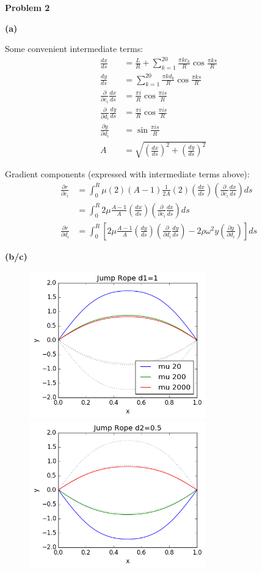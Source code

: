 \documentclass[11pt]{article}
\newcommand{\problem}{\medskip \noindent \textbf}
\begin{document}
\pagebreak

\problem{Problem 2}

\problem{(a)}

Some convenient intermediate terms:
\begin{align*}
\frac{dx}{ds} &= \frac{L}{R} + \sum_{k=1}^{20} \frac{\pi k c_k}{R} \cos \frac{\pi k s}{R}\\
\frac{dy}{ds} &= \sum_{k=1}^{20} \frac{\pi k d_k}{R} \cos \frac{\pi k s}{R}\\
\frac{\partial}{\partial c_i}\frac{dx}{ds} &= \frac{\pi i}{R} \cos \frac{\pi i s}{R}\\
\frac{\partial}{\partial d_i}\frac{dy}{ds} &= \frac{\pi i}{R} \cos \frac{\pi i s}{R}\\
\frac{\partial y}{\partial d_i} &= \sin \frac{\pi i s}{R}\\
A &= \sqrt{\left(\tfrac{dx}{ds}\right)^2 + \left(\tfrac{dy}{ds}\right)^2}
\end{align*}

Gradient components (expressed with intermediate terms above):
\begin{align*}
\frac{\partial r}{\partial c_i} &= \int_0^R \mu (2) \left(A-1\right) \frac{1}{2A} (2) \left(\frac{dx}{ds}\right) \left(\frac{\partial}{\partial c_i}\frac{dx}{ds} \right) ds\\
&= \int_0^R 2 \mu \frac{A - 1}{A} \left(\frac{dx}{ds}\right) \left(\frac{\partial}{\partial c_i}\frac{dx}{ds} \right) ds\\
\frac{\partial r}{\partial d_i} &= \int_0^R \left[ 2 \mu \frac{A - 1}{A} \left(\frac{dy}{ds}\right) \left(\frac{\partial}{\partial d_i}\frac{dy}{ds} \right) - 2 \rho \omega^2 y \left(\frac{\partial y}{\partial d_i}\right) \right] ds
\end{align*}

\problem{(b/c)}

\begin{figure}[h!]
  \includegraphics[width=3in]{rope1.png}
  \includegraphics[width=3in]{rope2.png}
\end{figure}
\end{document}
